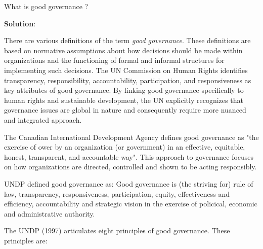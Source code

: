\documentclass[
  openany]{book}
\newcommand{\question}{\item}
\newenvironment{solution}{ {\bfseries Solution}:}{}
\begin{document}
\begin{questions}

\question What is good governance ?

\begin{solution}

There are various definitions of the term \textit{good governance}. These definitions are based on normative assumptions about how decisions should be made within organizations and the functioning of formal and informal structures for implementing such decisions. The UN Commission on Human Rights identifies transparency, responsibility, accountability, participation, and responsiveness as key attributes of good governance. By linking good governance specifically to human rights and sustainable development, the UN explicitly recognizes that governance issues are global in nature and consequently require more nuanced and integrated approach. 

The Canadian International Development Agency defines good governance as "the exercise of ower by an organization (or government) in an effective, equitable, honest, transparent, and accountable way". This approach to governance focuses on how organizations are directed, controlled and shown to be acting responsibly.

UNDP defined good governance as: Good governance is (the striving for) rule of law, transparency, responsiveness, participation, equity, effectiveness and efficiency, accountability and strategic vision in the exercise of policical, economic and administrative authority.

The UNDP (1997) articulates eight principles of good governance. These principles are:


\end{solution}
\end{questions}
\end{document}

